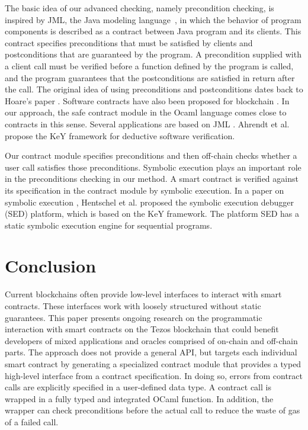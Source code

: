 \documentclass[a4paper,USenglish,american,cleveref, autoref, thm-restate]{oasics-v2021}
\begin{document}
The basic idea of our advanced checking, namely precondition checking,
is inspired by JML, the Java modeling
language~\cite{Leavens2006DesignBC, 101007}, in which the behavior of 
program components is described as a contract between Java
program and its clients. This contract specifies
preconditions that must be satisfied by clients and postconditions
that are guaranteed by the program. A precondition supplied with a
client call must be verified before a function defined by the program
is called, and the program guarantees that the postconditions are
satisfied in return after the call. The original idea of using
preconditions and postconditions dates back to Hoare's paper
\cite{101145}. Software contracts have also been proposed for
blockchain \cite{DBLP:journals/fbloc/Bartoletti20}.
In our approach, the safe contract module in the Ocaml language comes
close to contracts in this sense. Several
applications are based on JML \cite{Tran2017}. Ahrendt et
al. \cite{keY} propose the KeY framework for deductive software
verification.  

Our contract module specifies preconditions and then off-chain checks whether a user call satisfies those preconditions. Symbolic execution plays an important role in the preconditions checking in our method. A smart contract is verified against its specification in the contract module by symbolic execution. In a paper on symbolic execution \cite{Hentschel}, Hentschel et al. proposed the symbolic execution debugger (SED) platform, which is based on the KeY framework. The platform SED has a static symbolic execution engine for sequential programs.

\section{Conclusion}
\label{sec:conclusion}

Current blockchains often provide low-level interfaces to interact
with smart contracts. These interfaces work with loosely structured
without static guarantees. This paper presents ongoing research on the
programmatic interaction with smart contracts on the Tezos blockchain
that could benefit developers of mixed applications and
oracles comprised of on-chain and off-chain parts. The approach does
not provide a general API, but targets each 
individual smart contract by generating a specialized contract module
that provides a typed high-level interface from a contract
specification. In doing so, errors from contract calls are explicitly
specified in a user-defined data type. A contract call is wrapped in a
fully typed and integrated OCaml function. In addition, the wrapper can check preconditions before the 
actual call to reduce the waste of gas of a failed call.






\end{document}
